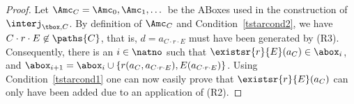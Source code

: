 \documentclass{lmcs}
\theoremstyle{definition}
\newtheorem{claim}{Claim}
\let\OriginalQedSymbol\qedsymbol
\renewcommand{\qedsymbol}{\OriginalQedSymbol\setcounter{claim}{0}}
\let\NormalQedSymbol\qedsymbol
\newenvironment{clmproof}[1]{\renewcommand{\qedsymbol}{$\dashv$}\begin{proof}[Proof of claim.]\space#1}{\end{proof}\renewcommand{\qedsymbol}{\NormalQedSymbol}}
\begin{document}
\begin{proof}
  Let $\Amc_C = \Amc_0, \Amc_1,\dots$ be the ABoxes used in the
  construction of $\interj_{\tbox,C}$. By definition of $\Amc_C$ and
  Condition~\ref{tstarcond2}, we have $C\cdot r\cdot E\not\in\paths{C}$, that is,
  $d=a_{C\cdot r\cdot E}$ must have been generated by (R3).
  Consequently, there is an $i\in\natno$ such that
  $\existsr{r}{E}(a_{C})\in\abox_i$, and $\abox_{i+1}=\abox_i\cup\{
  r(a_{C},a_{C\cdot r\cdot E}),E(a_{C\cdot r\cdot E})\}$.
  Using Condition~\ref{tstarcond1} one can now easily prove that
  $\existsr{r}{E}(a_{C})$ can only have been added due to an application
  of (R2).


\end{proof}
\end{document}
